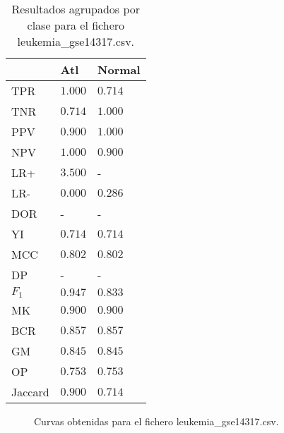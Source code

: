 \begin{table}[htp]
    \small
    \centering
    \begin{tabularx}{\columnwidth}{l Y Y}
                &  Atl                  & Normal        \\\hline
        TPR     &  $1.000$              & $0.714$       \\\hline
        TNR     &  $0.714$              & $1.000$       \\\hline
        PPV     &  $0.900$              & $1.000$       \\\hline
        NPV     &  $1.000$              & $0.900$       \\\hline
        LR+     &  $3.500$              & -             \\\hline
        LR-     &  $0.000$              & $0.286$       \\\hline
        DOR     &  -                    & -             \\\hline
        YI      &  $0.714$              & $0.714$       \\\hline
        MCC     &  $0.802$              & $0.802$       \\\hline
        DP      &  -                    & -             \\\hline
        $F_{1}$ &  $0.947$              & $0.833$       \\\hline
        MK      &  $0.900$              & $0.900$       \\\hline
        BCR     &  $0.857$              & $0.857$       \\\hline
        GM      &  $0.845$              & $0.845$       \\\hline
        OP      &  $0.753$              & $0.753$       \\\hline
        Jaccard &  $0.900$              & $0.714$       \\\hline
    \end{tabularx}
    \caption{Resultados agrupados por clase para el fichero leukemia\_gse14317.csv.}
    \label{tab:21}
\end{table}

\clearpage

\begin{figure}[htp]
    \centering
    \caption{Curvas obtenidas para el fichero leukemia\_gse14317.csv.}
    \label{fig:15}
\end{figure}

\bigbreak

\lipsum[1]

\clearpage

